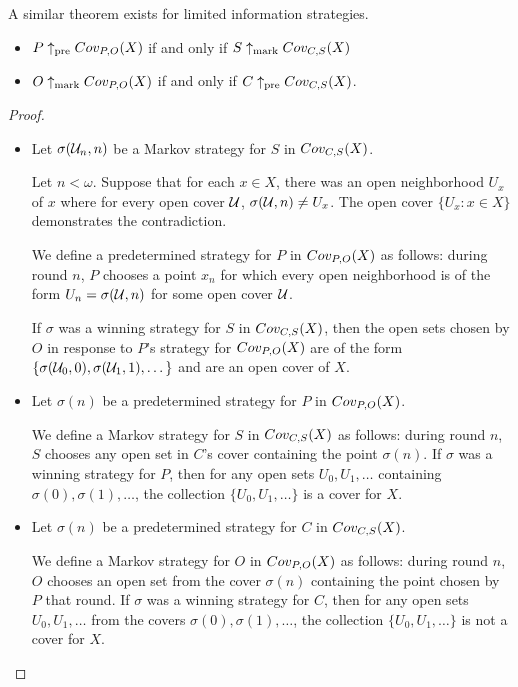   A similar theorem exists for limited information strategies.

  \begin{theorem}
    \begin{itemize}
      \item $P\uparrow_{\text{pre}}Cov_{P,O}(X)$ if and only if $S\uparrow_{\text{mark}}Cov_{C,S}(X)$
      \item $O\uparrow_{\text{mark}}Cov_{P,O}(X)$ if and only if $C\uparrow_{\text{pre}}Cov_{C,S}(X)$.
    \end{itemize}
  \end{theorem}

  \begin{proof}

    \begin{itemize}
      \item
      Let $\sigma(\mathcal{U}_n,n)$ be a Markov strategy for $S$ in $Cov_{C,S}(X)$. 

      Let $n<\omega$. Suppose that for each $x\in X$, there was an open neighborhood $U_x$ of $x$ where for every open cover $\mathcal{U}$, $\sigma(\mathcal{U},n)\not=U_x$. The open cover $\{U_x : x\in X\}$ demonstrates the contradiction.

      We define a predetermined strategy for $P$ in $Cov_{P,O}(X)$ as follows: during round $n$, $P$ chooses a point $x_n$ for which every open neighborhood is of the form $U_n = \sigma(\mathcal{U},n)$ for some open cover $\mathcal{U}$.

      If $\sigma$ was a winning strategy for $S$ in $Cov_{C,S}(X)$, then the open sets chosen by $O$ in response to $P$'s strategy for $Cov_{P,O}(X)$ are of the form $\{\sigma(\mathcal{U}_0,0),\sigma(\mathcal{U}_1,1),\dots\}$ and are an open cover of $X$.

      \item
      Let $\sigma(n)$ be a predetermined strategy for $P$ in $Cov_{P,O}(X)$.

      We define a Markov strategy for $S$ in $Cov_{C,S}(X)$ as follows: during round $n$, $S$ chooses any open set in $C$'s cover containing the point $\sigma(n)$. If $\sigma$ was a winning strategy for $P$, then for any open sets $U_0,U_1,\dots$ containing $\sigma(0),\sigma(1),\dots$, the collection $\{U_0,U_1,\dots\}$ is a cover for $X$.

      \item
      Let $\sigma(n)$ be a predetermined strategy for $C$ in $Cov_{C,S}(X)$.

      We define a Markov strategy for $O$ in $Cov_{P,O}(X)$ as follows: during round $n$, $O$ chooses an open set from the cover $\sigma(n)$ containing the point chosen by $P$ that round. If $\sigma$ was a winning strategy for $C$, then for any open sets $U_0,U_1,\dots$ from the covers $\sigma(0),\sigma(1),\dots$, the collection $\{U_0,U_1,\dots\}$ is not a cover for $X$.


\end{itemize}
\end{proof}
